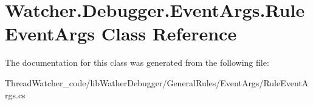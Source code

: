 \hypertarget{class_watcher_1_1_debugger_1_1_event_args_1_1_rule_event_args}{\section{Watcher.\+Debugger.\+Event\+Args.\+Rule\+Event\+Args Class Reference}
\label{class_watcher_1_1_debugger_1_1_event_args_1_1_rule_event_args}
}


The documentation for this class was generated from the following file\+:\begin{DoxyCompactItemize}
\item 
Thread\+Watcher\+\_\+code/lib\+Wather\+Debugger/\+General\+Rules/\+Event\+Args/Rule\+Event\+Args.\+cs\end{DoxyCompactItemize}
